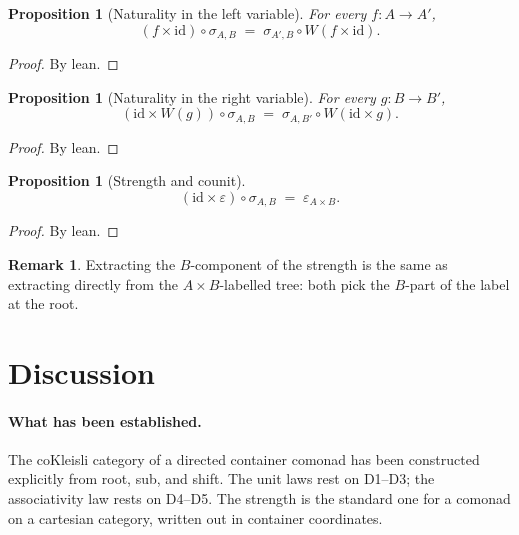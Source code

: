 \documentclass[11pt,a4paper]{article}
\theoremstyle{plain}
\newtheorem{proposition}[theorem]{Proposition}
\theoremstyle{definition}
\newtheorem{remark}[theorem]{Remark}
\newcommand{\id}{\mathrm{id}}
\begin{document}
\begin{proposition}[Naturality in the left variable]\label{prop:strength-nat-left}
For every $f : A \to A'$,
\begin{equation}
  (f \times \id) \circ \sigma_{A,B}
  \;=\;
  \sigma_{A',B} \circ W(f \times \id).
\end{equation}
\end{proposition}

\begin{proof}
By lean.
\end{proof}

\begin{proposition}[Naturality in the right variable]\label{prop:strength-nat-right}
For every $g : B \to B'$,
\begin{equation}
  (\id \times W(g)) \circ \sigma_{A,B}
  \;=\;
  \sigma_{A,B'} \circ W(\id \times g).
\end{equation}
\end{proposition}

\begin{proof}
By lean.
\end{proof}

\begin{proposition}[Strength and counit]\label{prop:strength-counit}
\begin{equation}
  (\id \times \varepsilon) \circ \sigma_{A,B}
  \;=\;
  \varepsilon_{A \times B}.
\end{equation}
\end{proposition}

\begin{proof}
By lean.
\end{proof}

\begin{remark}
Extracting the $B$-component of the strength is the same as extracting
directly from the $A \times B$-labelled tree: both pick the $B$-part of the
label at the root.
\end{remark}

\section{Discussion}

\paragraph{What has been established.}
The coKleisli category of a directed container comonad has been constructed
explicitly from root, sub, and shift. The unit laws rest on D1--D3; the
associativity law rests on D4--D5. The strength is the standard one for a
comonad on a cartesian category, written out in container coordinates.
\end{document}
